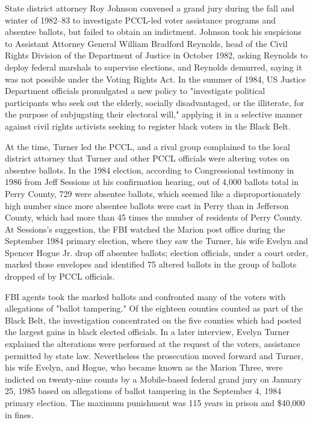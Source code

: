 State district attorney Roy Johnson convened a grand jury during the
fall and winter of 1982--83 to investigate PCCL-led voter assistance
programs and absentee ballots, but failed to obtain an indictment.
Johnson took his suspicions to Assistant Attorney General William
Bradford Reynolds, head of the Civil Rights Division of the Department
of Justice in October 1982, asking Reynolds to deploy federal marshals
to supervise elections, and Reynolds demurred, saying it was not
possible under the Voting Rights Act. In the summer of 1984, US Justice
Department officials promulgated a new policy to "investigate political
participants who seek out the elderly, socially disadvantaged, or the
illiterate, for the purpose of subjugating their electoral will,"
applying it in a selective manner against civil rights activists seeking
to register black voters in the Black Belt.

At the time, Turner led the PCCL, and a rival group complained to the
local district attorney that Turner and other PCCL officials were
altering votes on absentee ballots. In the 1984 election, according to
Congressional testimony in 1986 from Jeff Sessions at his confirmation
hearing, out of 4,000 ballots total in Perry County, 729 were absentee
ballots, which seemed like a disproportionately high number since more
absentee ballots were cast in Perry than in Jefferson County, which had
more than 45 times the number of residents of Perry County. At
Sessions's suggestion, the FBI watched the Marion post office during the
September 1984 primary election, where they saw the Turner, his wife
Evelyn and Spencer Hogue Jr. drop off absentee ballots; election
officials, under a court order, marked those envelopes and identified 75
altered ballots in the group of ballots dropped of by PCCL officials.

FBI agents took the marked ballots and confronted many of the voters
with allegations of "ballot tampering." Of the eighteen counties counted
as part of the Black Belt, the investigation concentrated on the five
counties which had posted the largest gains in black elected officials.
In a later interview, Evelyn Turner explained the alterations were
performed at the request of the voters, assistance permitted by state
law. Nevertheless the prosecution moved forward and Turner, his wife
Evelyn, and Hogue, who became known as the Marion Three, were indicted
on twenty-nine counts by a Mobile-based federal grand jury on January
25, 1985 based on allegations of ballot tampering in the September 4,
1984 primary election. The maximum punishment was 115 years in prison
and \$40,000 in fines.

